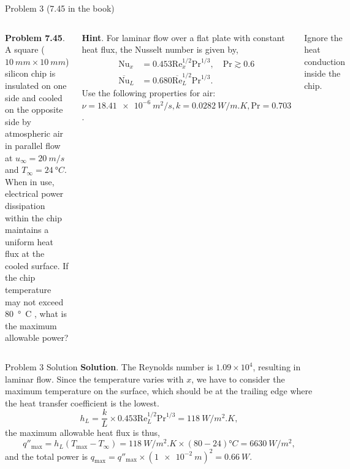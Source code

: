 \documentclass[9pt, aspectratio=169, handout]{beamer}
\begin{document}
\begin{frame}{Problem 3 (7.45 in the book)}
    \begin{columns}
        \textbf{Problem 7.45}. A square ($\SI{10}{mm}\times \SI{10}{mm}$) silicon chip is insulated on one side and cooled on the opposite side by atmospheric air in parallel flow at $u_{\infty}=\SI{20}{m/s}$ and $T_{\infty} = \SI{24}{\degree C}$.
        When in use, electrical power dissipation within the chip maintains a uniform heat flux at the cooled surface. If the chip temperature may not exceed \SI{80}{\degree C} , what is the maximum allowable power?

        \vspace{1em}

        \textbf{Hint}. For laminar flow over a flat plate with constant heat flux, the Nusselt number is given by,
        \begin{equation*}
            \begin{aligned}
                \mathrm{Nu}_x &= 0.453\mathrm{Re}_x^{1/2}\mathrm{Pr}^{1/3}, \quad \mathrm{Pr} \gtrsim 0.6 \\
                \overline{\mathrm{Nu}}_L &= 0.680\overline{\mathrm{Re}}_L^{1/2}\mathrm{Pr}^{1/3}.
            \end{aligned}
        \end{equation*}
        Use the following properties for air: $\nu = \SI{18.41e-6}{m^2/s}, k = \SI{0.0282}{W/m.K}, \mathrm{Pr} = 0.703$.
        
        Ignore the heat conduction inside the chip.
    \end{columns}
\end{frame}

\begin{frame}{Problem 3 Solution}
    \textbf{Solution}. The Reynolds number is $1.09 \times 10^4$, resulting in laminar flow. Since the temperature varies with $x$, we have to consider the maximum temperature on the surface, which should be at the trailing edge where the heat transfer coefficient is the lowest.
    \begin{equation*}
        h_L = \frac{k}{L} \times 0.453 \mathrm{Re}_L^{1/2} \mathrm{Pr}^{1/3} = \SI{118}{W/m^2.K},
    \end{equation*}
    the maximum allowable heat flux is thus,
    \begin{equation*}
        q''_{\text{max}} = h_L (T_{\text{max}} - T_{\infty}) = \SI{118}{W/m^2.K} \times (80 - 24) \si{\degree C} = \SI{6630}{W/m^2},
    \end{equation*}
    and the total power is $q_{\text{max}} = q''_{\text{max}} \times (\SI{1e-2}{m})^2 = \SI{0.66}{W}$. \hfill\qedsymbol
\end{frame}
\end{document}
